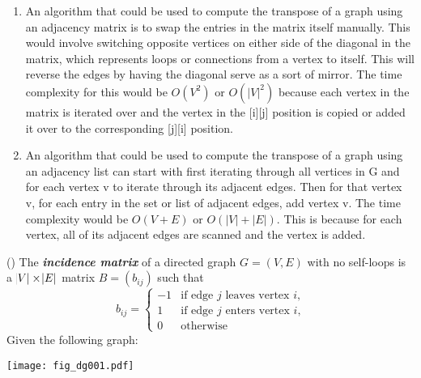 \documentclass[addpoints,11pt]{exam}
\begin{document}
\begin{questions}
\begin{solutionorbox}
\begin{enumerate}[label=(\alph*)]
    \item An algorithm that could be used to compute the transpose of a graph using an adjacency matrix is to swap the entries in the matrix itself manually. This would involve switching opposite vertices on either side of the diagonal in the matrix, which represents loops or connections from a vertex to itself. This will reverse the edges by having the diagonal serve as a sort of mirror. The time complexity for this would be $O(V^2)$ or $O(|V|^2)$ because each vertex in the matrix is iterated over and the vertex in the [i][j] position is copied or added it over to the corresponding [j][i] position.
    \item An algorithm that could be used to compute the transpose of a graph using an adjacency list can start with first iterating through all vertices in G and for each vertex v to iterate through its adjacent edges. Then for that vertex v, for each entry in the set or list of adjacent edges, add vertex v. The time complexity would be $O(V+E)$ or $O(|V|+|E|)$. This is because for each vertex, all of its adjacent edges are scanned and the vertex is added. 
\end{enumerate}
\end{solutionorbox}
\newpage


\question (\totalpoints {})
The \textbf{\textit{incidence matrix}} of a directed graph $G=(V,E)$ with no self-loops is a $\abs{V} \times \abs{E}$ matrix $B = (b_{ij})$ such that
$$b_{ij} = \begin{cases}
	-1 & \text{if edge }j\text{ leaves vertex }i\text{,}\\
	1  & \text{if edge }j\text{ enters vertex }i\text{,}\\
	0  & \text{otherwise}
\end{cases}
$$
Given the following graph:\\
\begin{center}
\texttt{[image: fig\_dg001.pdf]}
\end{center}
\begin{parts}

\end{parts}
\end{questions}
\end{document}
